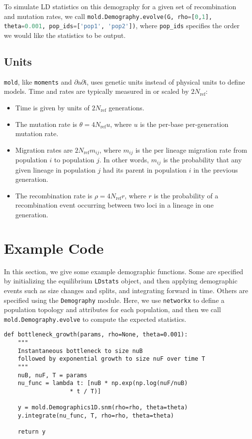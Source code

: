 \documentclass[10pt]{article}
\makeatletter
\newcommand{\dadi}{$\partial$a$\partial$i\xspace}
\newcommand{\mold}{\texttt{mold}\xspace}
\newcommand{\py}[1]{\lstinline[breaklines=true,language=Python, showstringspaces=False]@#1@}
\makeatother
\begin{document}
To simulate LD statistics on this demography for a given set of recombination and mutation rates, we call \py{mold.Demography.evolve(G, rho=[0,1], theta=0.001, pop_ids=['pop1', 'pop2'])}, where \py{pop_ids} specifies the order we would like the statistics to be output.


\subsection{Units}

\mold, like \texttt{moments} and \dadi, uses genetic units instead of physical units to define models.
Time and rates are typically measured in or scaled by $2N_\text{ref}$:
\begin{itemize}
\item Time is given by units of $2N_\text{ref}$ generations.
\item The mutation rate is $\theta=4N_\text{ref}u$, where $u$ is the per-base per-generation mutation rate.
\item Migration rates are $2N_\text{ref}m_{ij}$, where $m_{ij}$ is the per lineage migration rate from population $i$ to population $j$. In other words, $m_{ij}$ is the probability that any given lineage in population $j$ had its parent in population $i$ in the previous generation.
\item The recombination rate is $\rho=4N_\text{ref}r$, where $r$ is the probability of a recombination event occurring between two loci in a lineage in one generation.
\end{itemize}

\section{Example Code}

In this section, we give some example demographic functions.
Some are specified by initializing the equilibrium \py{LDstats} object, and then applying demographic events such as size changes and splits, and integrating forward in time.
Others are specified using the \py{Demography} module.
Here, we use \py{networkx} to define a population topology and attributes for each population, and then we call \py{mold.Demography.evolve} to compute the expected statistics.

\clearpage

\begin{lstlisting}[caption={\textbf{Bottleneck model:} At time \py{T} in the past, an equilibrium population goes through a bottleneck of depth \py{nuB}, recovering to relative size \py{nuF} through exponential growth. In all examples listed here, we need to \py{import numpy as np} and \py{import moments.LD as mold}.}, float, label={lst:bottleneck}]
def bottleneck_growth(params, rho=None, theta=0.001):
    """
    Instantaneous bottleneck to size nuB
    followed by exponential growth to size nuF over time T
    """
    nuB, nuF, T = params
    nu_func = lambda t: [nuB * np.exp(np.log(nuF/nuB) 
    			   * t / T)]

    y = mold.Demographics1D.snm(rho=rho, theta=theta)
    y.integrate(nu_func, T, rho=rho, theta=theta)

    return y
\end{lstlisting}
\end{document}
